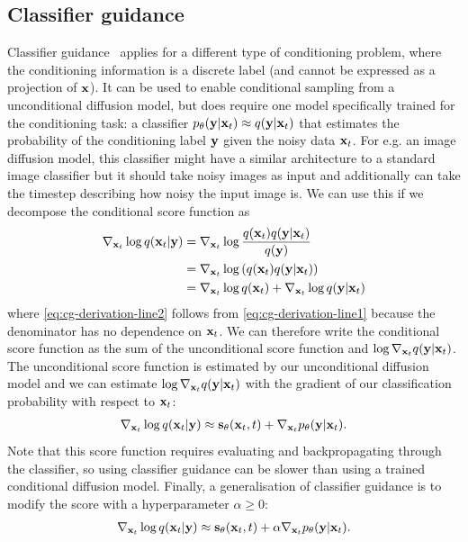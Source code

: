 \subsection{Classifier guidance}
Classifier guidance~\citep{song2020score} applies for a different type of conditioning problem, where the conditioning information is a discrete label (and cannot be expressed as a projection of ${\mathbf{x}}$). It can be used to enable conditional sampling from a unconditional diffusion model, but does require one model specifically trained for the conditioning task: a classifier $p_\theta({\mathbf{y}}|{\mathbf{x}}_t) \approx q({\mathbf{y}}|{\mathbf{x}}_t)$ that estimates the probability of the conditioning label ${\mathbf{y}}$ given the noisy data ${\mathbf{x}}_t$. For e.g. an image diffusion model, this classifier might have a similar architecture to a standard image classifier but it should take noisy images as input and additionally can take the timestep describing how noisy the input image is. We can use this if we decompose the conditional score function as
\begin{align}
    \nabla_{{\mathbf{x}}_t} \log q({\mathbf{x}}_t|{\mathbf{y}}) &= \nabla_{{\mathbf{x}}_t} \log \frac{q({\mathbf{x}}_t)q({\mathbf{y}}|{\mathbf{x}}_t)}{q({\mathbf{y}})} \label{eq:cg-derivation-line1} \\
    &= \nabla_{{\mathbf{x}}_t} \log \left( q({\mathbf{x}}_t) q({\mathbf{y}}|{\mathbf{x}}_t) \right)  \label{eq:cg-derivation-line2} \\
    &= \nabla_{{\mathbf{x}}_t} \log q({\mathbf{x}}_t) + \nabla_{{\mathbf{x}}_t} \log q({\mathbf{y}}|{\mathbf{x}}_t)  \label{eq:cg-derivation-line3}
\end{align}
where \cref{eq:cg-derivation-line2} follows from \cref{eq:cg-derivation-line1} because the denominator has no dependence on ${\mathbf{x}}_t$. We can therefore write the conditional score function as the sum of the unconditional score function and $\log \nabla_{{\mathbf{x}}_t} q({\mathbf{y}}|{\mathbf{x}}_t)$. The unconditional score function is estimated by our unconditional diffusion model and we can estimate $\log \nabla_{{\mathbf{x}}_t} q({\mathbf{y}}|{\mathbf{x}}_t)$ with the gradient of our classification probability with respect to ${\mathbf{x}}_t$:
\begin{align}
    \nabla_{{\mathbf{x}}_t} \log q({\mathbf{x}}_t|{\mathbf{y}}) \approx {\mathbf{s}}_\theta({\mathbf{x}}_t, t) + \nabla_{{\mathbf{x}}_t} p_\theta({\mathbf{y}}|{\mathbf{x}}_t).
\end{align}
Note that this score function requires evaluating and backpropagating through the classifier, so using classifier guidance can be slower than using a trained conditional diffusion model. Finally, a generalisation of classifier guidance is to modify the score with a hyperparameter $\alpha \geq 0$:
\begin{align}
    \nabla_{{\mathbf{x}}_t} \log q({\mathbf{x}}_t|{\mathbf{y}}) \approx {\mathbf{s}}_\theta({\mathbf{x}}_t, t) + \alpha \nabla_{{\mathbf{x}}_t} p_\theta({\mathbf{y}}|{\mathbf{x}}_t). \label{eq:cg-score-function}
\end{align}
